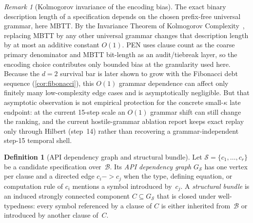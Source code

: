 \documentclass[11pt,a4paper]{article}
\def\to{->}%
\theoremstyle{plain}
\theoremstyle{definition}
\newtheorem{definition}[theorem]{Definition}
\theoremstyle{remark}
\newtheorem{remark}[theorem]{Remark}
\begin{document}
\begin{remark}[Kolmogorov invariance of the encoding bias]
\label{rem:kappa-invariance}
The exact binary description length of a specification depends on the chosen prefix-free universal grammar, here MBTT.
By the Invariance Theorem of Kolmogorov Complexity~\cite{kolmogorov}, replacing MBTT by any other universal grammar changes that description length by at most an additive constant $O(1)$.
PEN uses clause count as the coarse primary denominator and MBTT bit-length as an audit/tiebreak layer, so the encoding choice contributes only bounded bias at the granularity used here.
Because the $d=2$ survival bar is later shown to grow with the Fibonacci debt sequence (\cref{cor:fibonacci}), this $O(1)$ grammar dependence can affect only finitely many low-complexity edge cases and is asymptotically negligible. But that asymptotic observation is not empirical protection for the concrete small-$\kappa$ late endpoint: at the current 15-step scale an $O(1)$ grammar shift can still change the ranking, and the current hostile-grammar ablation report keeps exact replay only through Hilbert (step~14) rather than recovering a grammar-independent step-15 temporal shell.
\end{remark}

\begin{definition}[API dependency graph and structural bundle]
\label{def:api-graph}
Let $\mathcal{S}=\{c_1,\dots,c_r\}$ be a candidate specification over~$\mathcal{B}$.
Its \emph{API dependency graph} $G_{\mathcal{S}}$ has one vertex per clause and a directed edge $c_i \to c_j$ when the type, defining equation, or computation rule of $c_i$ mentions a symbol introduced by~$c_j$.
A \emph{structural bundle} is an induced strongly connected component $C \subseteq G_{\mathcal{S}}$ that is closed under well-typedness: every symbol referenced by a clause of $C$ is either inherited from~$\mathcal{B}$ or introduced by another clause of~$C$.
\end{definition}
\end{document}
